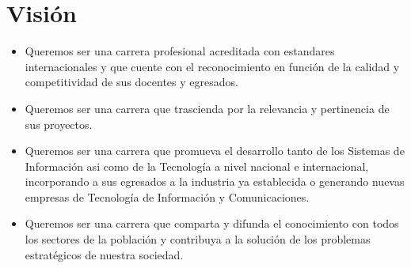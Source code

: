 \section{Visión}\label{sec:cs-vision}

\begin{itemize}
\item Queremos ser una carrera profesional acreditada con estandares internacionales y que cuente con el 
reconocimiento en función de la calidad y competitividad de sus docentes y egresados.

\item Queremos ser una carrera que trascienda por la relevancia y pertinencia de sus proyectos.

\item Queremos ser una carrera que promueva el desarrollo tanto de los Sistemas de Información
asi como de la Tecnología a nivel nacional e internacional, incorporando a sus egresados a la industria
ya establecida o generando nuevas empresas de Tecnología de Información y Comunicaciones.

\item Queremos ser una carrera que comparta y difunda el conocimiento con todos los sectores de la población 
y contribuya a la solución de los problemas estratégicos de nuestra sociedad.
\end{itemize}
